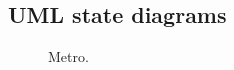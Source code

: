 \documentclass[12pt]{article}
\begin{document}
\begin{spacing}{1.5}
\newpage

\section{UML state diagrams}

\begin{figure}[h!]
	\centering
		
		  \caption{Metro.}
  \label{fig:metro-fig}
\end{figure}

\end{spacing}
\end{document}
